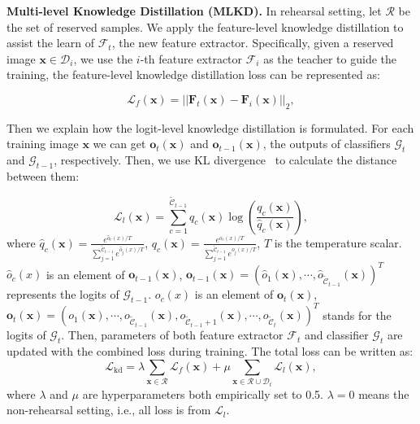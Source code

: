 \documentclass[letterpaper]{article} %
\begin{document}
\noindent\textbf{Multi-level Knowledge Distillation (MLKD).}
In rehearsal setting, let $\mathcal{R}$ be the set of reserved samples. We apply the feature-level knowledge distillation to assist the learn of $\mathcal{F}_{t}$, the new feature extractor. Specifically, given a reserved image $\boldsymbol{x}\in \mathcal{D}_{i}$, we use the $i$-th feature extractor $\mathcal{F}_{i}$ as the teacher to guide the training, the feature-level knowledge distillation loss can be represented as:

\begin{equation}
\mathcal{L}_{f}(\boldsymbol{x})=||\boldsymbol{F}_{t}(\boldsymbol{x})- \boldsymbol{F}_{i}(\boldsymbol{x})||_2,
\label{e6}
\end{equation}

Then we explain how the logit-level knowledge distillation is formulated. For each training image  $\boldsymbol{x}$ we can get $\boldsymbol{o}_{t}(\boldsymbol{x})$ and $\boldsymbol{o}_{t-1}(\boldsymbol{x})$, the outputs of classifiers $\mathcal{G}_{t}$ and $\mathcal{G}_{t-1}$, respectively. Then, we use KL divergence~\cite{r23} to calculate the distance between them:

\begin{equation}
\mathcal{L}_{l}(\boldsymbol{x})=\sum_{c=1}^{\tilde{\mathcal{C}}_{t-1}}{q}_{c}(\boldsymbol{x}) \log \left(\frac{{q}_{c}(\boldsymbol{x})}{\hat{q}_{c}(\boldsymbol{x})}\right),
\label{e7}
\end{equation}
where $\hat{q}_{c}(\boldsymbol{x})=\frac{e^{\hat{o}_{c}(x) / T}}{\sum_{j=1}^{\tilde{\mathcal{C}}_{t-1}} e^{\hat{o}_{j}(x) / T}}$, $ q_{c}(\boldsymbol{x})=\frac{e^{o_{c}(x) / T}}{\sum_{j=1}^{\tilde{\mathcal{C}}_{t-1}} e^{o_{j}(x) / T}}$, $T$ is the temperature scalar. $\hat{o}_{c}(x)$ is an element of $\boldsymbol{o}_{t-1}(\boldsymbol{x})$, $\boldsymbol{o}_{t-1}(\boldsymbol{x})=(\hat{o}_{1}(\boldsymbol{x}), \cdots, \hat{o}_{\tilde{\mathcal{C}}_{t-1}}(\boldsymbol{x}))^{T}$ represents the logits of $\mathcal{G}_{t-1}$. $o_{c}(x)$ is an element of $\boldsymbol{o}_{t}(\boldsymbol{x})$, $\boldsymbol{o}_{t}(\boldsymbol{x}) = (o_{1}(\boldsymbol{x}), \cdots, o_{\tilde{\mathcal{C}}_{t-1}}(\boldsymbol{x}), o_{\tilde{\mathcal{C}}_{t-1}+1}(\boldsymbol{x}), \cdots, o_{\tilde{\mathcal{C}}_{t}}(\boldsymbol{x}))^{T}$ stands for the logits of $\mathcal{G}_{t}$. Then, parameters of both feature extractor $\mathcal{F}_{t}$ and classifier $\mathcal{G}_{t}$ are updated with the combined loss during training. The total loss can be written as:
\begin{equation}
\mathcal{L}_{\mathrm{kd}}= \lambda \sum_{\boldsymbol{x}\in \mathcal{R}} \mathcal{L}_{f}(\boldsymbol{x}) + \mu  \sum_{\boldsymbol{x}\in \mathcal{R}\cup\mathcal{D}_{t}} \mathcal{L}_{l}(\boldsymbol{x}),
\label{e88}
\end{equation}
where $\lambda$ and $\mu$ are hyperparameters both empirically set to 0.5. $\lambda=0$ means the non-rehearsal setting, i.e., all loss is from $\mathcal{L}_{l}$.
\end{document}
